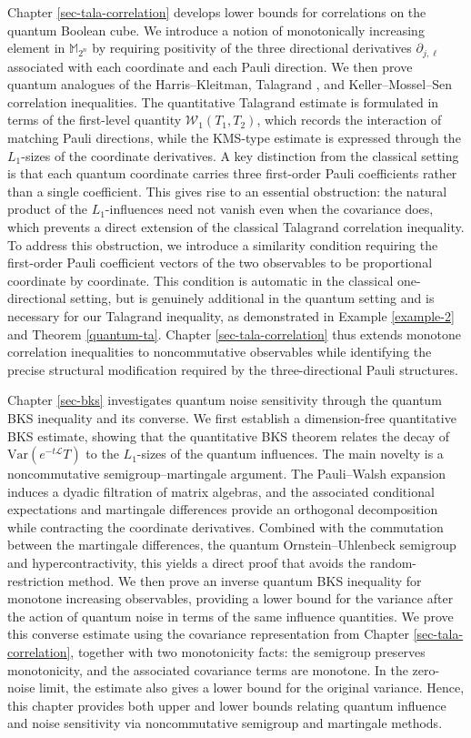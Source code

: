 \documentclass{amsbook}
\theoremstyle{definition}
\theoremstyle{remark}
\numberwithin{section}{chapter}
\numberwithin{equation}{chapter}
\newcommand{\1}{\mathbf{1}}
\begin{document}
Chapter \ref{sec-tala-correlation} develops lower bounds for correlations on the quantum Boolean cube.  We introduce a notion of monotonically increasing element in $\mathbb{M}_{2^n}$ by requiring positivity of the three directional derivatives $\partial_{j,\ell}$ associated with each coordinate and each Pauli direction.  We then prove quantum analogues of the Harris--Kleitman, Talagrand \cite{Ta1996}, and Keller--Mossel--Sen \cite{KMS2014} correlation inequalities.  The quantitative Talagrand estimate is formulated in terms of the first-level quantity $\mathcal{W}_1(T_1,T_2)$, which records the interaction of matching Pauli directions, while the KMS-type estimate is expressed through the $L_1$-sizes of the coordinate derivatives. A key distinction from the classical setting is that each quantum coordinate carries three first-order Pauli coefficients rather than a single coefficient.  This gives rise to an essential obstruction: the natural product of the $L_{1}$-influences need not vanish even when the covariance does, which prevents a direct extension of the classical Talagrand correlation inequality. To address this obstruction, we introduce a similarity condition requiring the first-order Pauli coefficient vectors of the two observables to be proportional coordinate by coordinate.  This condition is automatic in the classical one-directional setting, but is genuinely additional in the quantum setting and is necessary for our Talagrand inequality, as demonstrated in Example \ref{example-2} and Theorem \ref{quantum-ta}.  Chapter \ref{sec-tala-correlation} thus extends monotone correlation inequalities to noncommutative observables while identifying the precise structural modification required by the three-directional Pauli structures.

Chapter \ref{sec-bks} investigates quantum noise sensitivity through the quantum BKS inequality and its converse. We first establish a dimension-free quantitative BKS estimate, showing that the quantitative BKS theorem relates the decay of $\mathrm{Var}(e^{-t\mathcal L}T)$ to the $L_{1}$-sizes of the quantum influences.  The main novelty is a noncommutative semigroup--martingale argument. The Pauli--Walsh expansion induces a dyadic filtration of matrix algebras, and the associated conditional expectations and martingale differences provide an orthogonal decomposition while contracting the coordinate derivatives. Combined with the commutation between the martingale differences, the quantum Ornstein--Uhlenbeck semigroup and  hypercontractivity, this yields a direct proof that avoids the random-restriction method. We then prove an inverse quantum BKS inequality for monotone increasing observables, providing a lower bound for the variance after the action of quantum noise in terms of the same influence quantities. We prove this converse estimate using the covariance representation from Chapter \ref{sec-tala-correlation}, together with two monotonicity facts: the semigroup preserves monotonicity, and the associated covariance terms are monotone. In the zero-noise limit, the estimate also gives a lower bound for the original variance. Hence, this chapter provides both upper and lower bounds relating quantum influence and noise sensitivity via noncommutative semigroup and martingale methods.
\end{document}
